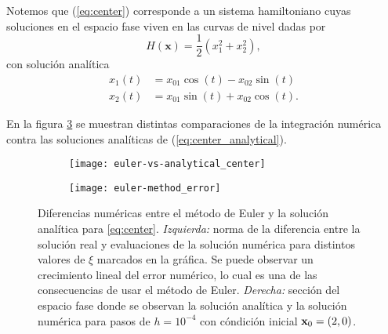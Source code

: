 Notemos que (\ref{eq:center}) corresponde a un sistema hamiltoniano cuyas soluciones en el espacio fase viven en las curvas de nivel dadas por
\begin{equation*}
H(\mathbf{x}) = \frac{1}{2} \left( x_1^2 + x_2^2 \right),
\end{equation*} 
con solución analítica
\begin{align}
 x_1(t) &= x_{01}\cos{(t)} - x_{02}\sin{(t)} \nonumber \\
 x_2(t) &= x_{01}\sin{(t)} + x_{02}\cos{(t)}.
 \label{eq:center_analytical}
\end{align}

En la figura \ref{fig:center_anal_comparison} se muestran distintas comparaciones de la integración numérica contra las soluciones analíticas de (\ref{eq:center_analytical}).

\begin{figure}[h!]
\centering
\begin{subfigure}{0.49\textwidth}
	\centering
	\texttt{[image: euler-vs-analytical\_center]}
	\label{fig:center-eu_vs_anal}
\end{subfigure}
%
\begin{subfigure}{0.49\textwidth}
	\centering
	\texttt{[image: euler-method\_error]}
	\label{fig:center_not-closed}
\end{subfigure}
\caption{Diferencias numéricas entre el método de Euler y la solución analítica para \ref{eq:center}. \textit{Izquierda:} norma de la diferencia entre la solución real y evaluaciones de la solución numérica para distintos valores de $\xi$ marcados en la gráfica. Se puede observar un crecimiento lineal del error numérico, lo cual es una de las consecuencias de usar el método de Euler. \textit{Derecha:} sección del espacio fase donde se observan la solución analítica y la solución numérica para pasos de $h=10^{-4}$ con cóndición inicial $\mathbf{x}_0 = (2,0)$.}
\label{fig:center_anal_comparison}
\end{figure}


